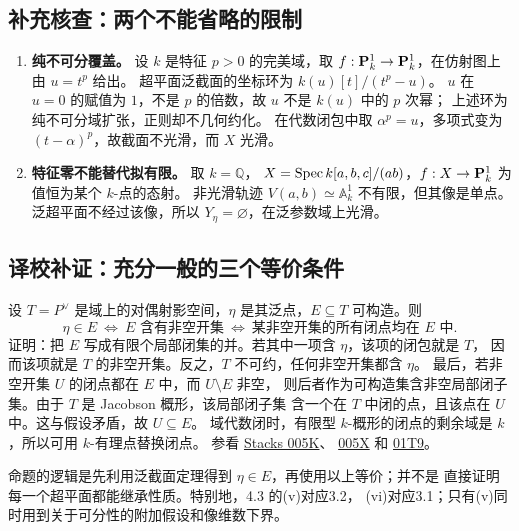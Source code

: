 \subsection*{补充核查：两个不能省略的限制}
\begin{enumerate}
 \item \textbf{纯不可分覆盖。} 设 $k$ 是特征 $p>0$ 的完美域，取
 $f:\PP^1_k\to\PP^1_k$，在仿射图上由 $u=t^p$ 给出。
 超平面泛截面的坐标环为 $k(u)[t]/(t^p-u)$。
 $u$ 在 $u=0$ 的赋值为 $1$，不是 $p$ 的倍数，故 $u$ 不是 $k(u)$ 中的 $p$ 次幂；
 上述环为纯不可分域扩张，正则却不几何约化。
 在代数闭包中取 $\alpha^p=u$，多项式变为 $(t-\alpha)^p$，故截面不光滑，而 $X$ 光滑。
 \item \textbf{特征零不能替代拟有限。} 取 $k=\mathbb Q$，
 $X=\operatorname{Spec} k[a,b,c]/(ab)$，$f:X\to\PP^1_k$ 为值恒为某个 $k$-点的态射。
 非光滑轨迹 $V(a,b)\simeq\mathbb A^1_k$ 不有限，但其像是单点。
 泛超平面不经过该像，所以 $Y_\eta=\varnothing$，在泛参数域上光滑。
\end{enumerate}

\endgroup


\hypertarget{D18-092-notes}{}
\begingroup
\def\OO{\mathcal O}\def\FF{\mathcal F}\def\GG{\mathcal G}
\def\PP{\mathbf P}\def\calP{\mathcal P}\def\dd{\delta}
\def\Div{\operatorname{Div}}\def\depth{\operatorname{depth}}
\def\pr{\operatorname{pr}}\def\coker{\operatorname{coker}}
\subsection*{译校补证：充分一般的三个等价条件}
设 $T=P^\vee$ 是域上的对偶射影空间，$\eta$ 是其泛点，$E\subseteq T$ 可构造。则
\[
\eta\in E
\ \Longleftrightarrow\
\text{$E$ 含有非空开集}
\ \Longleftrightarrow\
\text{某非空开集的所有闭点均在 $E$ 中}.
\]
证明：把 $E$ 写成有限个局部闭集的并。若其中一项含 $\eta$，该项的闭包就是 $T$，
因而该项就是 $T$ 的非空开集。反之，$T$ 不可约，任何非空开集都含 $\eta$。
最后，若非空开集 $U$ 的闭点都在 $E$ 中，而 $U\setminus E$ 非空，
则后者作为可构造集含非空局部闭子集。由于 $T$ 是 Jacobson 概形，该局部闭子集
含一个在 $T$ 中闭的点，且该点在 $U$ 中。这与假设矛盾，故 $U\subseteq E$。
域代数闭时，有限型 $k$-概形的闭点的剩余域是 $k$，所以可用 $k$-有理点替换闭点。
参看 \href{https://stacks.math.columbia.edu/tag/005K}{Stacks 005K}、
\href{https://stacks.math.columbia.edu/tag/005X}{005X} 和
\href{https://stacks.math.columbia.edu/tag/01T9}{01T9}。

命题的逻辑是先利用泛截面定理得到 $\eta\in E$，再使用以上等价；并不是
直接证明每一个超平面都能继承性质。特别地，4.3 的(v)对应3.2，
(vi)对应3.1；只有(v)同时用到关于可分性的附加假设和像维数下界。

